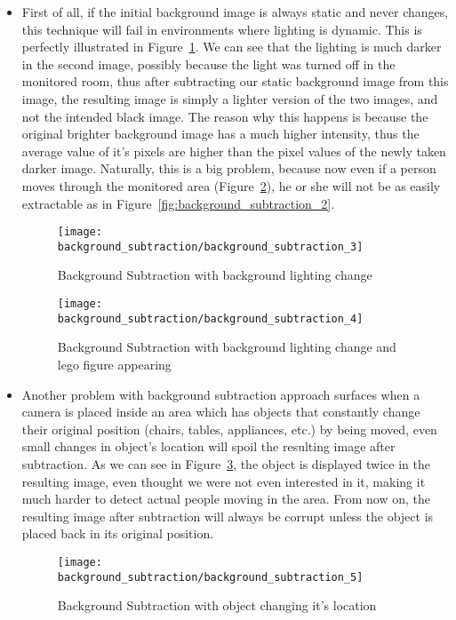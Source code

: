 	\begin{itemize}	
	\item First of all, if the initial background image is always static and never changes, this technique will fail in environments where lighting is dynamic. This is perfectly illustrated in Figure~\ref{fig:background_subtraction_3}. We can see that the lighting is much darker in the second image, possibly because the light was turned off in the monitored room, thus after subtracting our static background image from this image, the resulting image is simply a lighter version of the two images, and not the intended black image. The reason why this happens is because the original brighter background image has a much higher intensity, thus the average value of it's pixels are higher than the pixel values of the newly taken darker image. Naturally, this is a big problem, because now even if a person moves through the monitored area (Figure~\ref{fig:background_subtraction_4}), he or she will not be as easily extractable as in Figure~\ref{fig:background_subtraction_2}.
	\begin{figure}[ht]
		\centering
		\texttt{[image: background\_subtraction/background\_subtraction\_3]}
		\caption{Background Subtraction with background lighting change}
		\label{fig:background_subtraction_3}
	\end{figure}
	\begin{figure}[ht]
		\centering
		\texttt{[image: background\_subtraction/background\_subtraction\_4]}
		\caption{Background Subtraction with background lighting change and lego figure appearing}
		\label{fig:background_subtraction_4}
	\end{figure}
	
	\item Another problem with background subtraction approach surfaces when a camera is placed inside an area which has objects that constantly change their original position (chairs, tables, appliances, etc.) by being moved, even small changes in object's location will spoil the resulting image after subtraction. As we can see in Figure~\ref{fig:background_subtraction_5}, the object is displayed twice in the resulting image, even thought we were not even interested in it, making it much harder to detect actual people moving in the area. From now on, the resulting image after subtraction will always be corrupt unless the object is placed back in its original position.
	\begin{figure}[ht]
		\centering
		\texttt{[image: background\_subtraction/background\_subtraction\_5]}
		\caption{Background Subtraction with object changing it's location}
		\label{fig:background_subtraction_5}
	\end{figure}
	\end{itemize}
	
